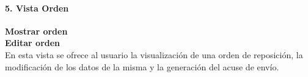 \paragraph{5. Vista Orden\\}
\textbf{Mostrar orden}\\
\textbf{Editar orden}\\

En esta vista se ofrece al usuario la visualización de una orden de reposición, la modificación de los datos de la misma y la generación del acuse de envío.

